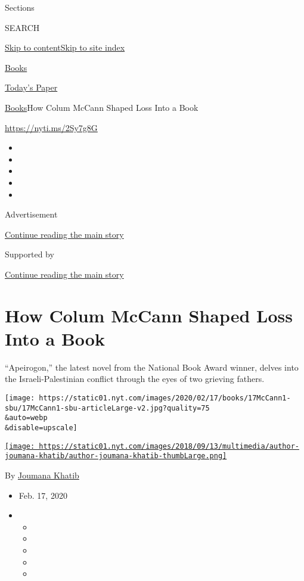 Sections

SEARCH

\protect\hyperlink{site-content}{Skip to
content}\protect\hyperlink{site-index}{Skip to site index}

\href{https://www.nytimes.com/section/books}{Books}

\href{https://myaccount.nytimes.com/auth/login?response_type=cookie\&client_id=vi}{}

\href{https://www.nytimes.com/section/todayspaper}{Today's Paper}

\href{/section/books}{Books}\textbar{}How Colum McCann Shaped Loss Into
a Book

\url{https://nyti.ms/2Sy7g8G}

\begin{itemize}
\item
\item
\item
\item
\item
\end{itemize}

Advertisement

\protect\hyperlink{after-top}{Continue reading the main story}

Supported by

\protect\hyperlink{after-sponsor}{Continue reading the main story}

\hypertarget{how-colum-mccann-shaped-loss-into-a-book}{%
\section{How Colum McCann Shaped Loss Into a
Book}\label{how-colum-mccann-shaped-loss-into-a-book}}

``Apeirogon,'' the latest novel from the National Book Award winner,
delves into the Israeli-Palestinian conflict through the eyes of two
grieving fathers.

\texttt{[image: https://static01.nyt.com/images/2020/02/17/books/17McCann1-sbu/17McCann1-sbu-articleLarge-v2.jpg?quality=75\\\&auto=webp\\\&disable=upscale]}

\href{https://nytimes.com/by/joumana-khatib}{\texttt{[image: https://static01.nyt.com/images/2018/09/13/multimedia/author-joumana-khatib/author-joumana-khatib-thumbLarge.png]}}

By \href{https://nytimes.com/by/joumana-khatib}{Joumana Khatib}

\begin{itemize}
\item
  Feb. 17, 2020
\item
  \begin{itemize}
  \item
  \item
  \item
  \item
  \item
  \end{itemize}
\end{itemize}

